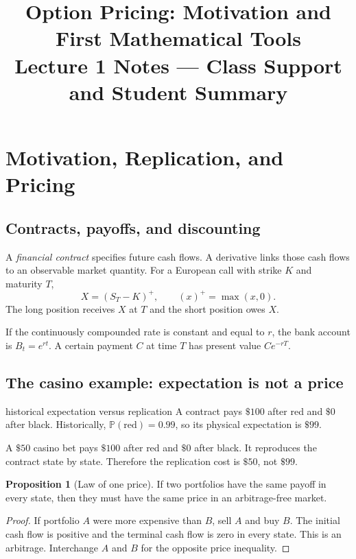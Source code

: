 \documentclass[10pt]{article}
\title{\textbf{Option Pricing: Motivation and First Mathematical Tools}\\
\large Lecture 1 Notes --- Class Support and Student Summary}
\author{}
\date{}
\newcommand{\Pbb}{\mathbb P}
\newcommand{\1}{\mathbf 1}
\theoremstyle{definition}
\newtheorem{proposition}[definition]{Proposition}
\begin{document}
\maketitle
\vspace{-1.4em}


\section{Motivation, Replication, and Pricing}

\subsection{Contracts, payoffs, and discounting}

A \emph{financial contract} specifies future cash flows. A derivative links
those cash flows to an observable market quantity. For a European call with
strike $K$ and maturity $T$,
\[
X=(S_T-K)^+,
\qquad (x)^+=\max(x,0).
\]
The long position receives $X$ at $T$ and the short position owes $X$.

If the continuously compounded rate is constant and equal to $r$, the bank
account is $B_t=e^{rt}$. A certain payment $C$ at time $T$ has present value
$Ce^{-rT}$.

\subsection{The casino example: expectation is not a price}

\begin{boardexample}{historical expectation versus replication}
A contract pays $\$100$ after red and $\$0$ after black. Historically,
$\Pbb(\text{red})=0.99$, so its physical expectation is $\$99$.

A $\$50$ casino bet pays $\$100$ after red and $\$0$ after black. It reproduces
the contract state by state. Therefore the replication cost is $\$50$, not
$\$99$.
\end{boardexample}

\begin{proposition}[Law of one price]
If two portfolios have the same payoff in every state, then they must have the
same price in an arbitrage-free market.
\end{proposition}

\begin{proof}
If portfolio $A$ were more expensive than $B$, sell $A$ and buy $B$. The initial
cash flow is positive and the terminal cash flow is zero in every state. This
is an arbitrage. Interchange $A$ and $B$ for the opposite price inequality.
\end{proof}
\end{document}

